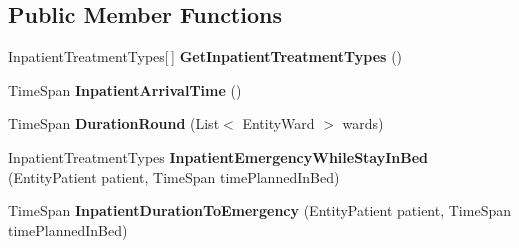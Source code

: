 \subsection*{Public Member Functions}
\begin{DoxyCompactItemize}
\item 
Inpatient\+Treatment\+Types\mbox{[}$\,$\mbox{]} {\bfseries Get\+Inpatient\+Treatment\+Types} ()\hypertarget{class_general_health_elements_1_1_input_output_1_1_inpatient_1_1_input_inpatient_detailed_surgical_a314c789cb4e518c68348bb81cfae881b}{}\label{class_general_health_elements_1_1_input_output_1_1_inpatient_1_1_input_inpatient_detailed_surgical_a314c789cb4e518c68348bb81cfae881b}

\item 
Time\+Span {\bfseries Inpatient\+Arrival\+Time} ()\hypertarget{class_general_health_elements_1_1_input_output_1_1_inpatient_1_1_input_inpatient_detailed_surgical_a47c5afb57129782808eb2f5e0ad4ea3d}{}\label{class_general_health_elements_1_1_input_output_1_1_inpatient_1_1_input_inpatient_detailed_surgical_a47c5afb57129782808eb2f5e0ad4ea3d}

\item 
Time\+Span {\bfseries Duration\+Round} (List$<$ Entity\+Ward $>$ wards)\hypertarget{class_general_health_elements_1_1_input_output_1_1_inpatient_1_1_input_inpatient_detailed_surgical_af83cbbbd14e10eea3a72f2c4631ae94a}{}\label{class_general_health_elements_1_1_input_output_1_1_inpatient_1_1_input_inpatient_detailed_surgical_af83cbbbd14e10eea3a72f2c4631ae94a}

\item 
Inpatient\+Treatment\+Types {\bfseries Inpatient\+Emergency\+While\+Stay\+In\+Bed} (Entity\+Patient patient, Time\+Span time\+Planned\+In\+Bed)\hypertarget{class_general_health_elements_1_1_input_output_1_1_inpatient_1_1_input_inpatient_detailed_surgical_ad80ddecfdf7cf224bd13201f85a41f41}{}\label{class_general_health_elements_1_1_input_output_1_1_inpatient_1_1_input_inpatient_detailed_surgical_ad80ddecfdf7cf224bd13201f85a41f41}

\item 
Time\+Span {\bfseries Inpatient\+Duration\+To\+Emergency} (Entity\+Patient patient, Time\+Span time\+Planned\+In\+Bed)\hypertarget{class_general_health_elements_1_1_input_output_1_1_inpatient_1_1_input_inpatient_detailed_surgical_aeb6767b82cbe0bfad2969f22ee1381c6}{}\label{class_general_health_elements_1_1_input_output_1_1_inpatient_1_1_input_inpatient_detailed_surgical_aeb6767b82cbe0bfad2969f22ee1381c6}


\end{DoxyCompactItemize}
